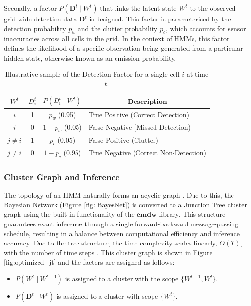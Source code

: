 \documentclass[10pt]{article}
\begin{document}
Secondly, a factor $P(\mathbf{D}^t \mid W^t)$ that links the latent state $W^t$ to the observed grid-wide detection data $\mathbf{D}^t$ is designed.
This factor is parameterised by the detection probability $p_w$ and the clutter probability $p_c$, which accounts for sensor inaccuracies 
across all cells in the grid. In the context of HMMs, this factor defines the likelihood of a specific observation being generated from a particular hidden state, 
otherwise known as an emission probability. 

\begin{table}[h]
\centering
\caption{Illustrative sample of the Detection Factor for a single cell $i$ at time $t$.}
\label{tab:observation_factor}
\begin{tabular}{|c|c|c|l|}
\hline
$W^t$ & $D^t_i$ & $P(D^t_i \mid W^t)$ & \multicolumn{1}{c|}{\textbf{Description}} \\ \hline
$i$   & 1       & $p_w$ (0.95)        & True Positive (Correct Detection)         \\ \hline
$i$   & 0       & $1 - p_w$ (0.05)    & False Negative (Missed Detection)         \\ \hline
$j \neq i$ & 1  & $p_c$ (0.05)        & False Positive (Clutter)                  \\ \hline
$j \neq i$ & 0  & $1 - p_c$ (0.95)    & True Negative (Correct Non-Detection)      \\ \hline
\end{tabular}
\end{table}

\subsubsection{Cluster Graph and Inference}
The topology of an HMM naturally forms an acyclic graph \cite{barber2012bayesian}. Due to this, the Bayesian Network (Figure \ref{fig: BayesNet}) is 
converted to a Junction Tree cluster graph using the built-in functionality of the $\mathbf{emdw}$ library. 
This structure guarantees exact inference through a single forward-backward message-passing schedule, resulting in a balance between 
computational efficiency and inference accuracy. Due to the tree structure, the time complexity scales linearly, $O(T)$, with the number of time steps \cite{barber2012bayesian}. This cluster graph is shown 
in Figure \ref{fig:optimized_jt} and the factors are assigned as follows: 
\begin{itemize}
  \item $P(W^t \mid W^{t-1})$ is assigned to a cluster with the scope $\{W^{t-1}, W^t\}$.
  \item $P(\mathbf{D}^t \mid W^t)$ is assigned to a cluster with scope $\{W^t\}$. 
\end{itemize}
\end{document}

